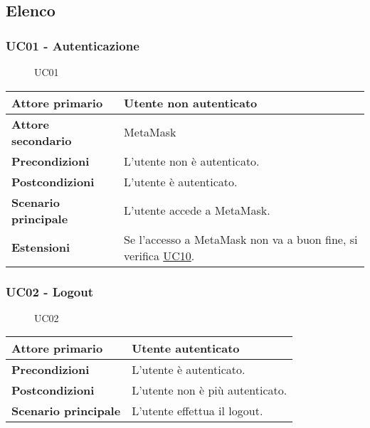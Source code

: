 \subsection{Elenco}

\subsubsection{UC01 - Autenticazione}
\label{UC01}

\begin{figure}[H]
    \centering
    
    \caption{UC01}
 \end{figure}

\begin{center}
\renewcommand{\arraystretch}{1.5}
\begin{tabular}{ | m{10em} | m{20em} | }
    \hline
    \textbf{Attore primario} & Utente non autenticato \\
    \hline
    \textbf{Attore secondario} & MetaMask \\
    \hline
    \textbf{Precondizioni} & L'utente non è autenticato. \\
    \hline
    \textbf{Postcondizioni} & L'utente è autenticato. \\
    \hline
    \textbf{Scenario principale} & L'utente accede a MetaMask. \\
    \hline
    \textbf{Estensioni} & Se l'accesso a MetaMask non va a buon fine, si verifica \hyperref[UC10]{UC10}. \\
    \hline
   \end{tabular}
\end{center}

\subsubsection{UC02 - Logout}
\label{UC02}

\begin{figure}[H]
    \centering
    
    \caption{UC02}
 \end{figure}

\begin{center}
\renewcommand{\arraystretch}{1.5}
\begin{tabular}{ | m{10em} | m{20em} | }
    \hline
    \textbf{Attore primario} & Utente autenticato \\
    \hline
    \textbf{Precondizioni} & L'utente è autenticato. \\
    \hline
    \textbf{Postcondizioni} & L'utente non è più autenticato. \\
    \hline
    \textbf{Scenario principale} & L'utente effettua il logout. \\
    \hline
   \end{tabular}
\end{center}

